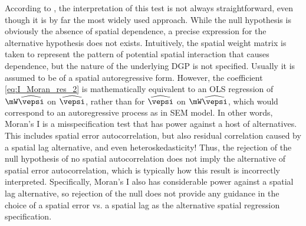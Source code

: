 \documentclass[english,12pt]{book}\usepackage[]{graphicx}\usepackage[]{xcolor}
\begin{document}





According to \citet[][p. 102]{anselin1988spatial}, the interpretation of this test is not always straightforward, even though it is by far the most widely used approach. While the null hypothesis is obviously the absence of spatial dependence, a precise expression for the alternative hypothesis does not exists. Intuitively, the spatial weight matrix is taken to represent the pattern of potential spatial interaction that causes dependence, but the nature of the underlying DGP is not specified. Usually it is assumed to be of a spatial autoregressive form. However, the coefficient \ref{eq:I_Moran_res_2} is mathematically equivalent to an OLS regression of $\mW\widehat{\vepsi}$ on $\widehat{\vepsi}$, rather than for $\widehat{\vepsi}$ on $\mW\widehat{\vepsi}$, which would correspond to an autoregressive process as in SEM model.  In other words, Moran's I is a misspecification test that has power against a host of alternatives. This includes spatial error autocorrelation, but also residual correlation caused by a spatial lag alternative, and even heteroskedasticity!  Thus, the rejection of the null hypothesis of no spatial autocorrelation does not imply the alternative of spatial error autocorrelation, which is typically how this result is incorrectly interpreted. Specifically, Moran's I also has considerable power against a spatial lag alternative, so rejection of the null does not provide any guidance in the choice of a spatial error vs. a spatial lag as the alternative spatial regression specification. 
\end{document}

